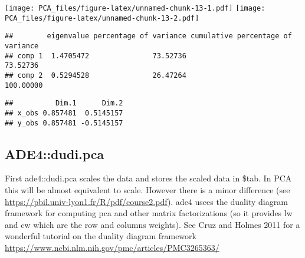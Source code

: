 \documentclass[]{article}
\newenvironment{Shaded}{\begin{snugshade}}{\end{snugshade}}
\newcommand{\KeywordTok}[1]{\textcolor[rgb]{0.13,0.29,0.53}{\textbf{#1}}}
\newcommand{\DataTypeTok}[1]{\textcolor[rgb]{0.13,0.29,0.53}{#1}}
\newcommand{\DecValTok}[1]{\textcolor[rgb]{0.00,0.00,0.81}{#1}}
\newcommand{\CommentTok}[1]{\textcolor[rgb]{0.56,0.35,0.01}{\textit{#1}}}
\newcommand{\OtherTok}[1]{\textcolor[rgb]{0.56,0.35,0.01}{#1}}
\newcommand{\OperatorTok}[1]{\textcolor[rgb]{0.81,0.36,0.00}{\textbf{#1}}}
\newcommand{\NormalTok}[1]{#1}
\begin{document}
\texttt{[image: PCA\_files/figure-latex/unnamed-chunk-13-1.pdf]}
\texttt{[image: PCA\_files/figure-latex/unnamed-chunk-13-2.pdf]}

\begin{Shaded}
\end{Shaded}

\begin{verbatim}
##        eigenvalue percentage of variance cumulative percentage of variance
## comp 1  1.4705472               73.52736                          73.52736
## comp 2  0.5294528               26.47264                         100.00000
\end{verbatim}

\begin{Shaded}
\end{Shaded}

\begin{verbatim}
##          Dim.1      Dim.2
## x_obs 0.857481  0.5145157
## y_obs 0.857481 -0.5145157
\end{verbatim}

\hypertarget{ade4dudi.pca}{%
\subsection{ADE4::dudi.pca}\label{ade4dudi.pca}}

First ade4::dudi.pca scales the data and stores the scaled data in
\$tab. In PCA this will be almost equivalent to scale. However there is
a minor difference (see
\url{https://pbil.univ-lyon1.fr/R/pdf/course2.pdf}). ade4 usees the
duality diagram framework for computing pca and other matrix
factorizations (so it provides lw and cw which are the row and columns
weights). See Cruz and Holmes 2011 for a wonderful tutorial on the
duality diagram framework
\url{https://www.ncbi.nlm.nih.gov/pmc/articles/PMC3265363/}

\begin{Shaded}
\end{Shaded}
\end{document}
